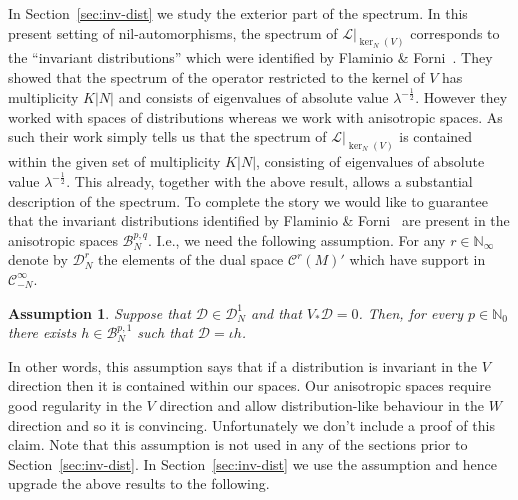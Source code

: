 \documentclass[a4paper,11pt]{amsart}
\newtheorem{assumption}[theorem]{Assumption}
\theoremstyle{remark}
\newcommand{\abs}[1]{\left|#1\right|} %
\newcommand{\cB}{\mathcal{B}} %
\newcommand{\cC}{\mathcal{C}} %
\newcommand{\cD}{\mathcal{D}} %
\newcommand{\cL}{\mathcal{L}} %
\newcommand{\bN}{\mathbb{N}} %
\newcommand{\dv}{V} %
\newcommand{\dw}{W} %
\begin{document}
In Section~\ref{sec:inv-dist} we study the exterior part of the spectrum. 
In this present setting of nil-automorphisms, the spectrum of \({\left.\cL\right|}_{\ker_N(\dv)}\) corresponds to the ``invariant distributions'' which were identified by Flaminio \& Forni~\cite{FF06}.
They showed that the spectrum of the operator restricted to the kernel of \(\dv\) has multiplicity \(K \abs{N}\) and consists of eigenvalues of absolute value \(\lambda^{-\frac{1}{2}}\).
However they worked with spaces of distributions whereas we work with anisotropic spaces. 
As such their work simply tells us that the spectrum of \({\left.\cL\right|}_{\ker_N(\dv)}\) is contained within the given set of multiplicity \(K \abs{N}\), consisting of eigenvalues of absolute value \(\lambda^{-\frac{1}{2}}\).
This already, together with the above result, allows a substantial description of the spectrum.
To complete the story we would like to guarantee that the invariant distributions identified by Flaminio \& Forni~\cite{FF06} are present in the anisotropic spaces \(\cB_{N}^{p,q}\).
I.e., we need the following assumption.
For any \(r\in\bN_\infty\) denote by \(\cD_{N}^{r}\) the elements of the dual space \({\cC^{r}(M)}'\) which have support in \(\cC_{-N}^{\infty}\).

\begin{assumption}
    \label{ass:inv-dist-in-Bpq}
    Suppose that \(\cD \in \cD_N^1\) and that \(V_{*}\cD = 0\).
    Then, for every \(p\in\bN_0\) there exists \(h \in \cB_{N}^{p,1}\) such that \(\cD = \iota h\).
\end{assumption}

In other words, this assumption says that if a distribution is invariant in the \(\dv\) direction then it is contained within our spaces. 
Our anisotropic spaces require good regularity in the \(\dv\) direction and allow distribution-like behaviour in the \(\dw\) direction and so it is convincing.
Unfortunately we don't include a proof of this claim. 
Note that this assumption is not used in any of the sections prior to Section~\ref{sec:inv-dist}.
In Section~\ref{sec:inv-dist} we use the assumption and hence upgrade the above results to the following.
\end{document}
